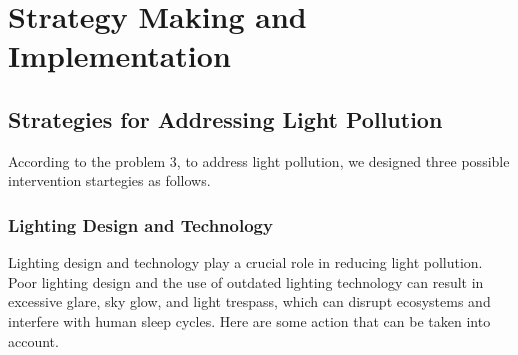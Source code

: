 \MinParskip{}

\section{Strategy Making and Implementation}

\subsection{Strategies for Addressing Light Pollution}

According to the problem 3, to address light pollution, we designed three possible intervention startegies as follows.

\subsubsection{Lighting Design and Technology}

Lighting design and technology play a crucial role in reducing light pollution. Poor lighting design and the use of outdated lighting technology can result in excessive glare, sky glow, and light trespass, which can disrupt ecosystems and interfere with human sleep cycles. Here are some action that can be taken into account.

